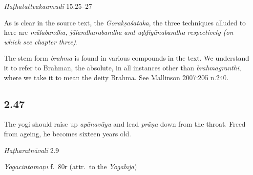 \begin{ekdosis}
\begin{testimonia}[hp02_046]
\emph{Haṭhatattvakaumudī} 15.25–27
\begin{versinnote}
\end{versinnote}
\end{testimonia}

\begin{philcomm}[hp02_046]
As is clear in the source text, the \emph{Gorakṣaśataka}, the three techniques alluded to here are \sl{mūlabandha, jālandharabandha} and \emph{uḍḍiyānabandha} respectively (on which see chapter three).

The stem form \emph{brahma} is found in various compounds in the text. We understand it to refer to Brahman, the absolute, in all instances other than \emph{brahmagranthi}, where we take it to mean the deity Brahmā. See Mallinson 2007:205 n.240.
\end{philcomm}

\subsection*{2.47}
\begin{translation}[hp02_047]
The yogi should raise up \emph{apānavāyu} and lead \emph{prāṇa} down from the throat. Freed from ageing, he becomes sixteen years old.
\end{translation}


\begin{testimonia}[hp02_047]
\emph{Haṭharatnāvalī} 2.9
\begin{versinnote}
\end{versinnote} 

\emph{Yogacintāmaṇī} f.~80r (attr.~to the \emph{Yogabīja})

\begin{versinnote}
\end{versinnote}


\end{testimonia}
\end{ekdosis}
